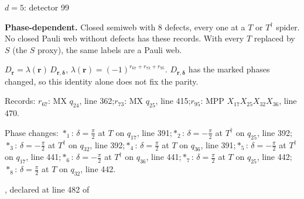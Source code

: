 \label{d5_det099}
{\Large $d=5$: detector 99}\par
\textbf{Phase-dependent.} Closed semiweb with 8 defects, every one at a $T$ or $T^\dagger$ spider. No closed Pauli web without defects has these records. With every $T$ replaced by $S$ (the $S$ proxy), the same labels are a Pauli web.
\begin{center}
\end{center}
\vspace{-1mm}
$D_{\boldsymbol r}=\lambda(\boldsymbol r)\,D_{\boldsymbol r,\boldsymbol\delta}$, \quad $\lambda(\boldsymbol r)=(-1)^{r_{67}+r_{73}+r_{95}}$. \qquad $D_{\boldsymbol r,\boldsymbol\delta}$ has the marked phases changed, so this identity alone does not fix the parity.
\par\smallskip\begin{minipage}{.98\linewidth}\small Records: $r_{67}$: MX $q_{24}$, line 362;\quad $r_{73}$: MX $q_{25}$, line 415;\quad $r_{95}$: MPP $X_{17}X_{25}X_{32}X_{36}$, line 470.\end{minipage}
\par\smallskip\begin{minipage}{.98\linewidth}\small Phase changes: $\ast_{1}$: $\delta=\frac{\pi}{2}$ at $T$ on $q_{17}$, line 391;\quad $\ast_{2}$: $\delta=-\frac{\pi}{2}$ at $T^\dagger$ on $q_{25}$, line 392;\quad $\ast_{3}$: $\delta=-\frac{\pi}{2}$ at $T^\dagger$ on $q_{32}$, line 392;\quad $\ast_{4}$: $\delta=\frac{\pi}{2}$ at $T$ on $q_{36}$, line 391;\quad $\ast_{5}$: $\delta=-\frac{\pi}{2}$ at $T^\dagger$ on $q_{17}$, line 441;\quad $\ast_{6}$: $\delta=-\frac{\pi}{2}$ at $T^\dagger$ on $q_{36}$, line 441;\quad $\ast_{7}$: $\delta=\frac{\pi}{2}$ at $T$ on $q_{25}$, line 442;\quad $\ast_{8}$: $\delta=\frac{\pi}{2}$ at $T$ on $q_{32}$, line 442.\end{minipage}
\vfill
{\footnotesize\texttt{}, declared at line 482 of \texttt{}}
\newpage

